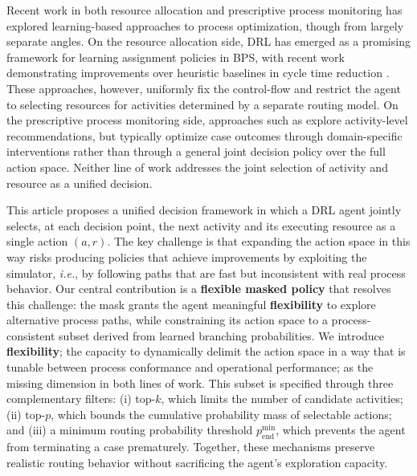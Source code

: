 \documentclass[runningheads]{llncs}
\begin{document}
Recent work in both resource allocation and prescriptive process monitoring has explored learning-based approaches to process optimization, though from largely separate angles. On the resource allocation side, DRL has emerged as a promising framework for learning assignment policies in BPS, with recent work demonstrating improvements over heuristic baselines in cycle time reduction \cite{Optimizing_Resource_Allocation_Policies, Learning_policies_drl}. These approaches, however, uniformly fix the control-flow and restrict the agent to selecting resources for activities determined by a separate routing model. On the prescriptive process monitoring side, approaches such as \cite{ppm_optimal_policy_temporal_data, ppm_resource_constraints} explore activity-level recommendations, but typically optimize case outcomes through domain-specific interventions rather than through a general joint decision policy over the full action space. Neither line of work addresses the joint selection of activity and resource as a unified decision.

This article proposes a unified decision framework in which a DRL agent jointly selects, at each decision point, the next activity and its executing resource as a single action $(a,r)$. The key challenge is that expanding the action space in this way risks producing policies that achieve improvements by exploiting the simulator, \emph{i.e.}, by following paths that are fast but inconsistent with real process behavior. Our central contribution is a \textbf{flexible masked policy} that resolves this challenge: the mask grants the agent meaningful \textbf{flexibility} to explore alternative process paths, while constraining its action space to a process-consistent subset derived from learned branching probabilities. We introduce \textbf{flexibility}; the capacity to dynamically delimit the action space in a way that is tunable between process conformance and operational performance; as the missing dimension in both lines of work. This subset is specified through three complementary filters: (i) top-$k$, which limits the number of candidate activities; (ii) top-$p$, which bounds the cumulative probability mass of selectable actions; and (iii) a minimum routing probability threshold $p_{\mathrm{end}}^{\min}$, which prevents the agent from terminating a case prematurely. Together, these mechanisms preserve realistic routing behavior without sacrificing the agent's exploration capacity.
\end{document}

